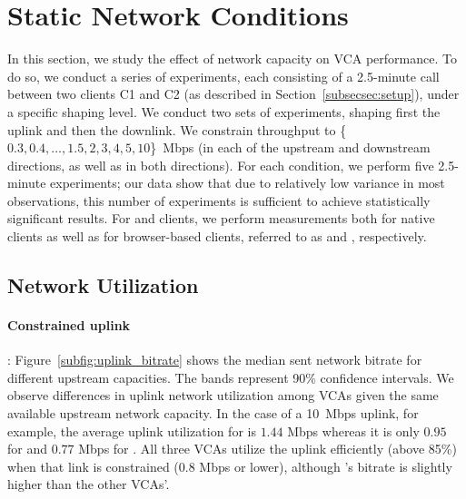\section{Static Network Conditions}\label{sec:static}

In this section, we study the effect of network capacity on VCA performance.
To do so, we conduct a series of experiments, each consisting of a 2.5-minute
call between two clients C1 and C2 (as described in
Section~\ref{subsecsec:setup}), under a specific shaping level. We conduct two
sets of experiments, shaping first the uplink and then the downlink.  We
constrain throughput to \{$0.3, 0.4, \dots, 1.5, 2, 3, 4, 5, 10$\}~Mbps (in
each of the upstream and downstream directions, as well as in both
directions). For each condition, we perform five 2.5-minute experiments; our
data show that due to relatively low variance in most observations, this
number of experiments is sufficient to achieve statistically significant
results.  For \zoom and \teams clients, we perform measurements both for
native clients as well as for browser-based clients, referred
to as \zoombrowser and \teamsbrowser, respectively. 





\subsection{Network Utilization}
\label{subsec:network_utilization}

\paragraph{Constrained uplink}: Figure~\ref{subfig:uplink_bitrate} shows the
median sent network bitrate for different upstream capacities. The bands
represent 90\% confidence intervals. We observe differences in uplink network
utilization among VCAs given the same available upstream network capacity. In
the case of a 10~Mbps uplink, for example, the average uplink utilization for
\teamsnative is $1.44$ Mbps whereas it is only $0.95$ for \meet and $0.77$
Mbps for \zoom. All three VCAs utilize the uplink efficiently (above 85\%)
when that link is constrained (0.8 Mbps or lower), although \meet's
bitrate is slightly higher than the other VCAs'.  

